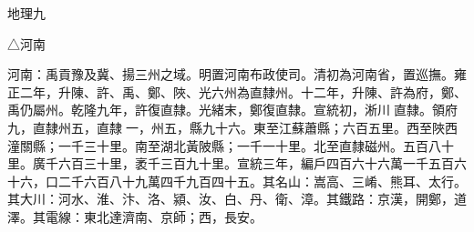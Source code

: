 
\begin{pinyinscope}
地理九

△河南

河南：禹貢豫及冀、揚三州之域。明置河南布政使司。清初為河南省，置巡撫。雍正二年，升陳、許、禹、鄭、陜、光六州為直隸州。十二年，升陳、許為府，鄭、禹仍屬州。乾隆九年，許復直隸。光緒末，鄭復直隸。宣統初，淅川直隸。領府九，直隸州五，直隸一，州五，縣九十六。東至江蘇蕭縣；六百五里。西至陜西潼關縣；一千三十里。南至湖北黃陂縣；一千一十里。北至直隸磁州。五百八十里。廣千六百三十里，袤千三百九十里。宣統三年，編戶四百六十六萬一千五百六十六，口二千六百八十九萬四千九百四十五。其名山：嵩高、三崤、熊耳、太行。其大川：河水、淮、汴、洛、潁、汝、白、丹、衛、漳。其鐵路：京漢，開鄭，道澤。其電線：東北達濟南、京師；西，長安。


\end{pinyinscope}
